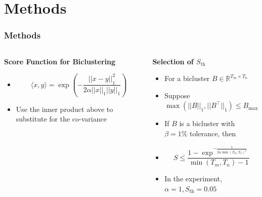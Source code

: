 \documentclass{beamer}
\begin{document}
\section{Methods}
\begin{frame}
    \frametitle{Methods}

    \begin{columns}
        \begin{column}{0.5\textwidth}
            \centering
            \textbf{Score Function for Biclustering}
            \begin{itemize}
                \item $$\langle x, y \rangle = \exp(-\frac{||x - y||_1^2}{2\alpha||x||_1||y||_1})$$
                \item Use the inner product above to substitute for the co-variance
            \end{itemize}
        \end{column}
        \begin{column}{0.5\textwidth}
            \centering
            \textbf{Selection of $S_{\text{th}}$}
            \begin{itemize}
                \item For a bicluster $B \in \mathbb{R}^{T_m \times T_n}$
                \item Suppose $\max(||B||_1,||B^{\top}||_1) \le B_{\max}$
                \item If $B$ is a bicluster with $\beta = 1\%$ tolerance, then
                \item $$ S \le \frac{1-\exp ^{-\frac{1}{2\alpha \min (T_m,T_n) ^2}}}{\min (T_m,T_n) - 1}$$
                \item In the experiment, $\alpha = 1, S_{\text{th}} = 0.05$
            \end{itemize}
        \end{column}
    \end{columns}

\end{frame}
\end{document}
